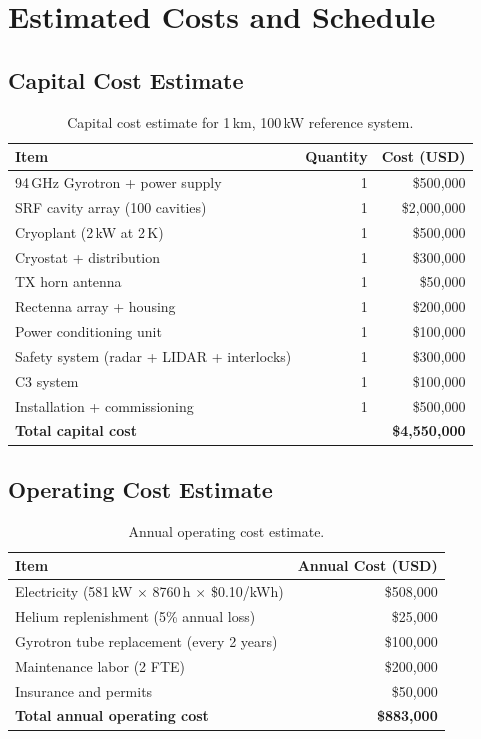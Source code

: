 \documentclass[11pt,a4paper]{article}
\begin{document}
\section{Estimated Costs and Schedule}

\subsection{Capital Cost Estimate}

\begin{table}[h]
\centering
\caption{Capital cost estimate for 1\,km, 100\,kW reference system.}
\begin{tabular}{lrr}
\toprule
Item & Quantity & Cost (USD) \\
\midrule
94\,GHz Gyrotron + power supply & 1 & \$500{,}000 \\
SRF cavity array (100 cavities) & 1 & \$2{,}000{,}000 \\
Cryoplant (2\,kW at 2\,K) & 1 & \$500{,}000 \\
Cryostat + distribution & 1 & \$300{,}000 \\
TX horn antenna & 1 & \$50{,}000 \\
Rectenna array + housing & 1 & \$200{,}000 \\
Power conditioning unit & 1 & \$100{,}000 \\
Safety system (radar + LIDAR + interlocks) & 1 & \$300{,}000 \\
C3 system & 1 & \$100{,}000 \\
Installation + commissioning & 1 & \$500{,}000 \\
\midrule
\textbf{Total capital cost} & & \textbf{\$4{,}550{,}000} \\
\bottomrule
\end{tabular}
\end{table}

\subsection{Operating Cost Estimate}

\begin{table}[h]
\centering
\caption{Annual operating cost estimate.}
\begin{tabular}{lr}
\toprule
Item & Annual Cost (USD) \\
\midrule
Electricity (581\,kW $\times$ 8760\,h $\times$ \$0.10/kWh) & \$508{,}000 \\
Helium replenishment (5\% annual loss) & \$25{,}000 \\
Gyrotron tube replacement (every 2 years) & \$100{,}000 \\
Maintenance labor (2 FTE) & \$200{,}000 \\
Insurance and permits & \$50{,}000 \\
\midrule
\textbf{Total annual operating cost} & \textbf{\$883{,}000} \\
\bottomrule
\end{tabular}
\end{table}
\end{document}
